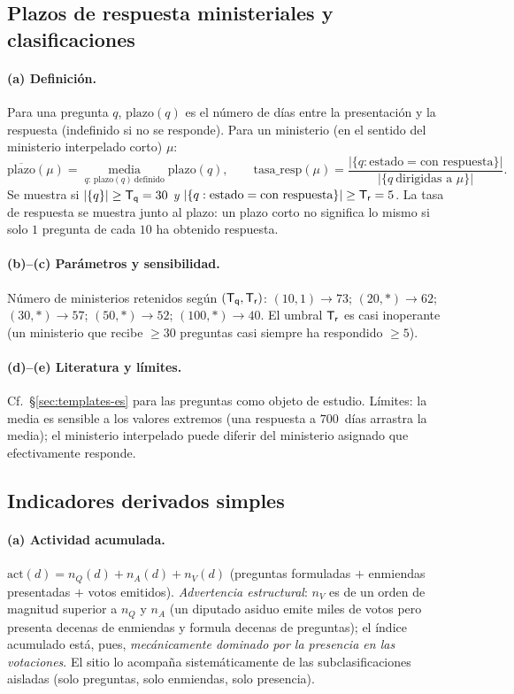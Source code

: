 \subsection{Plazos de respuesta ministeriales y clasificaciones}\label{sec:delais-es}

\paragraph{(a) Definición.} Para una pregunta $q$, $\mathrm{plazo}(q)$ es el número
de días entre la presentación y la respuesta (indefinido si no se responde). Para un
ministerio (en el sentido del \og{}ministerio interpelado\fg{} corto) $\mu$:
\[
\overline{\mathrm{plazo}}(\mu)=\operatorname*{media}_{q:\,\mathrm{plazo}(q)\ \text{definido}}\mathrm{plazo}(q),\qquad
\mathrm{tasa\_resp}(\mu)=\frac{|\{q:\text{estado}=\text{con respuesta}\}|}{|\{q\ \text{dirigidas a }\mu\}|}.
\]
Se muestra si $|\{q\}|\ge \mathsf{T_q}=30$ \emph{y} $|\{q:\text{estado}=\text{con respuesta}\}|\ge \mathsf{T_r}=5$.
La tasa de respuesta se muestra junto al plazo: un plazo corto no significa lo mismo
si solo $1$ pregunta de cada $10$ ha obtenido respuesta.

\paragraph{(b)--(c) Parámetros y sensibilidad.} Número de ministerios retenidos
según $(\mathsf{T_q},\mathsf{T_r})$: $(10,1)\to 73$; $(20,*)\to 62$; $(30,*)\to 57$;
$(50,*)\to 52$; $(100,*)\to 40$. El umbral $\mathsf{T_r}$ es casi inoperante (un
ministerio que recibe $\ge 30$ preguntas casi siempre ha respondido $\ge 5$).

\paragraph{(d)--(e) Literatura y límites.} Cf.~§\ref{sec:templates-es} para las
preguntas como objeto de estudio. Límites: la media es sensible a los valores
extremos (una respuesta a $700$~días arrastra la media); el \og{}ministerio
interpelado\fg{} puede diferir del \og{}ministerio asignado\fg{} que efectivamente
responde.

\subsection{Indicadores derivados simples}\label{sec:simples-es}

\paragraph{(a) Actividad acumulada.} $\mathrm{act}(d)=n_Q(d)+n_A(d)+n_V(d)$
(preguntas formuladas $+$ enmiendas presentadas $+$ votos emitidos).
\emph{Advertencia estructural}: $n_V$ es de un orden de magnitud superior a $n_Q$ y
$n_A$ (un diputado asiduo emite miles de votos pero presenta decenas de enmiendas y
formula decenas de preguntas); el índice acumulado está, pues, \emph{mecánicamente
dominado por la presencia en las votaciones}. El sitio lo acompaña sistemáticamente
de las subclasificaciones aisladas (solo preguntas, solo enmiendas, solo presencia).

